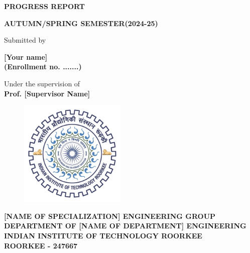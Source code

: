 \begin{titlepage}

\thispagestyle{empty}
    \begin{center}
         \vspace*{2cm}
            
        \Large
        \textbf{PROGRESS REPORT}
            
        \vspace{1cm}
        \Large
        \textbf{AUTUMN/SPRING SEMESTER(2024-25)} \\
        \vspace{\baselineskip}

            
        \vspace{1cm}
  

            
        \vspace{1cm}
        
        \begin{doublespace}
            Submitted by
            
            {\large
            \textbf{[Your name]}\\
            \textbf{(Enrollment no. .......)}}
        
            
        \vspace{1cm}
        
        Under the supervision of\\
        {\large \textbf{Prof. [Supervisor Name]}}
        \end{doublespace}
        \vspace{1cm}
        \begin{figure}[h]
            \centering
            \includegraphics[width=2in, height=2in]{logo.pdf}
            \label{fig:dtulogo}
        \end{figure}
        
            
        {\large
        \textbf{[NAME OF SPECIALIZATION] ENGINEERING GROUP}\\
        \vspace{0.25cm}
        \textbf{DEPARTMENT OF [NAME OF DEPARTMENT] ENGINEERING} \\
        \vspace{0.25cm}
        \textbf{INDIAN INSTITUTE OF TECHNOLOGY ROORKEE}\\
        \vspace{0.25cm}
        \textbf{ROORKEE - 247667}\\}
       
        

    \end{center}
\end{titlepage}